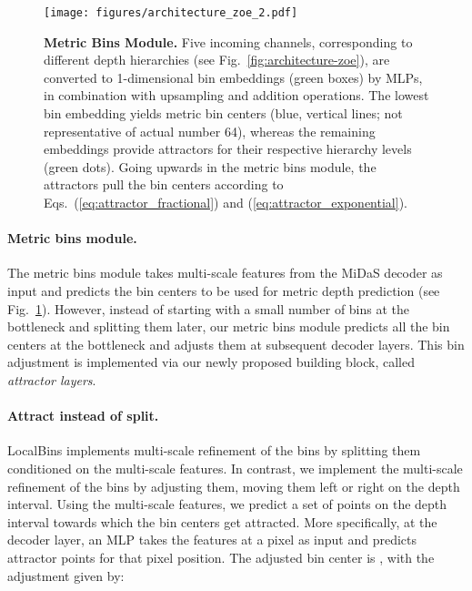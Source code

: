 \documentclass[10pt,twocolumn,letterpaper]{article}
\begin{document}
\begin{figure}[!htb]
    \texttt{[image: figures/architecture\_zoe\_2.pdf]}
    \vspace{-12pt}
    \caption{\textbf{Metric Bins Module.} Five incoming channels, corresponding to different depth hierarchies (see Fig.~\ref{fig:architecture-zoe}), are converted to 1-dimensional bin embeddings (green boxes) by MLPs, in combination with upsampling and addition operations. The lowest bin embedding yields metric bin centers (blue, vertical lines; not representative of actual number 64), whereas the remaining embeddings provide attractors for their respective hierarchy levels (green dots).
Going upwards in the metric bins module, the attractors pull the bin centers according to Eqs.~(\ref{eq:attractor_fractional}) and (\ref{eq:attractor_exponential}). 
    }
    \label{fig:architecture-bin-module}
    \vspace{-12pt}
\end{figure}

\paragraph{Metric bins module.}
The metric bins module takes multi-scale features from the MiDaS decoder as input and predicts the bin centers to be used for metric depth prediction (see Fig.~\ref{fig:architecture-bin-module}). However, instead of starting with a small number of bins at the bottleneck and splitting them later, our metric bins module predicts all the bin centers at the bottleneck and adjusts them at subsequent decoder layers. This bin adjustment is implemented via our newly proposed building block, called \textit{attractor layers}.

\paragraph{Attract instead of split.}
LocalBins implements multi-scale refinement of the bins by splitting them conditioned on the multi-scale features. In contrast, we implement the multi-scale refinement of the bins by adjusting them, moving them left or right on the depth interval. Using the multi-scale features, we predict a set of points on the depth interval towards which the bin centers get attracted. More specifically, at the  decoder layer, an MLP takes the features at a pixel as input and predicts  attractor points  for that pixel position. The adjusted bin center is , with the adjustment given by: 
    
\end{document}
